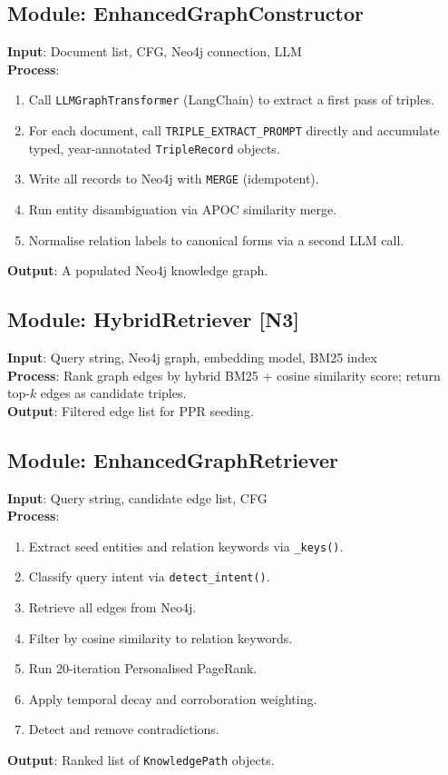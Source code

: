 \subsection{Module: EnhancedGraphConstructor}

\textbf{Input}: Document list, CFG, Neo4j connection, LLM\\
\textbf{Process}:
\begin{enumerate}
  \item Call \texttt{LLMGraphTransformer} (LangChain) to extract a first pass of triples.
  \item For each document, call \texttt{TRIPLE\_EXTRACT\_PROMPT} directly and accumulate
        typed, year-annotated \texttt{TripleRecord} objects.
  \item Write all records to Neo4j with \texttt{MERGE} (idempotent).
  \item Run entity disambiguation via APOC similarity merge.
  \item Normalise relation labels to canonical forms via a second LLM call.
\end{enumerate}
\textbf{Output}: A populated Neo4j knowledge graph.

\subsection{Module: HybridRetriever [N3]}

\textbf{Input}: Query string, Neo4j graph, embedding model, BM25 index\\
\textbf{Process}: Rank graph edges by hybrid BM25 + cosine similarity score;
return top-$k$ edges as candidate triples.\\
\textbf{Output}: Filtered edge list for PPR seeding.

\subsection{Module: EnhancedGraphRetriever}

\textbf{Input}: Query string, candidate edge list, CFG\\
\textbf{Process}:
\begin{enumerate}
  \item Extract seed entities and relation keywords via \texttt{\_keys()}.
  \item Classify query intent via \texttt{detect\_intent()}.
  \item Retrieve all edges from Neo4j.
  \item Filter by cosine similarity to relation keywords.
  \item Run 20-iteration Personalised PageRank.
  \item Apply temporal decay and corroboration weighting.
  \item Detect and remove contradictions.
\end{enumerate}
\textbf{Output}: Ranked list of \texttt{KnowledgePath} objects.

